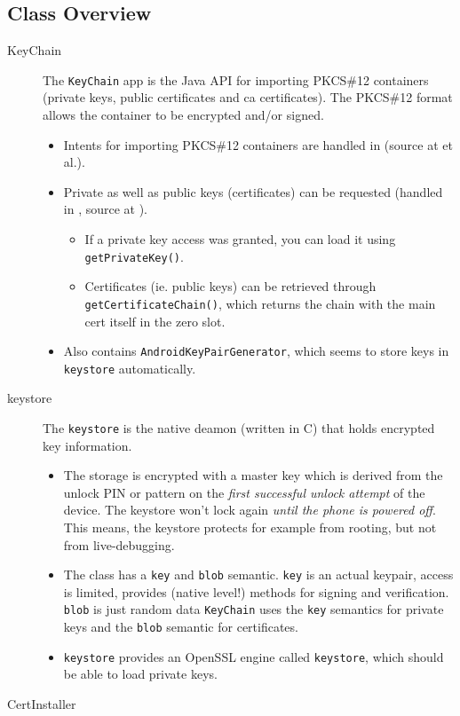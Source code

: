 \documentclass[a4paper]{scrartcl}
\begin{document}
	\subsection{Class Overview}
		\begin{description}
			\item[KeyChain] The \texttt{KeyChain} app is the Java API for importing PKCS\#12 containers (private keys, public certificates and ca certificates). The PKCS\#12 format allows the container to be encrypted and/or signed.
				\begin{itemize}
					\item Intents for importing PKCS\#12 containers are handled in  (source at  et al.).
					\item Private as well as public keys (certificates) can be requested (handled in , source at ).
					\begin{itemize}
						\item If a private key access was granted, you can load it using \texttt{getPrivate\-Key()}.
						\item Certificates (ie. public keys) can be retrieved through \texttt{getCertificate\-Chain()}, which returns the chain with the main cert itself in the zero slot.
					\end{itemize}
				\item Also contains \texttt{AndroidKeyPairGenerator}, which seems to store keys in \texttt{key\-store} automatically. %
				\end{itemize}
			\item[keystore] The \texttt{keystore} is the native deamon (written in C) that holds encrypted key information.
				\begin{itemize}
					\item The storage is encrypted with a master key which is derived from the unlock PIN or pattern on the \emph{first successful unlock attempt} of the device. The keystore won't lock again \emph{until the phone is powered off}. This means, the keystore protects for example from rooting, but not from live-debugging.
					\item The class has a \texttt{key} and \texttt{blob} semantic. \texttt{key} is an actual keypair, access is limited, provides (native level!) methods for signing and verification. \texttt{blob} is just random data \texttt{KeyChain} uses the \texttt{key} semantics for private keys and the \texttt{blob} semantic for certificates. %
					\item \texttt{keystore} provides an OpenSSL engine called \texttt{keystore}, which should be able to load private keys. %
				\end{itemize}
			\item [CertInstaller] %
		\end{description}
\end{document}
